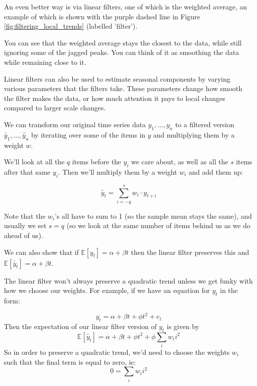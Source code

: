         An even better way is via linear filters, one of which is the weighted average, an example of which is shown with the purple dashed line in Figure \ref{fig:filtering_local_trends} (labelled 'filter').

        You can see that the weighted average stays the closest to the data, while still 
        ignoring some of the jagged peaks. You can think of it as smoothing the data while
        remaining close to it.

        Linear filters can also be used to estimate seasonal components by varying various parameters that the filters take. These parameters change how smooth the filter makes the data, or how much attention it pays to local changes compared to larger scale changes.

        We can transform our original time series data $y_1, \dots, y_n$ to a filtered
        version $\tilde{y_1}, \dots, \tilde{y_n}$ by iterating over some of the items
        in $y$ and multiplying them by a weight $w$. 

        We'll look at all the $q$ items before the $y_i$ we care about, as well as all the $s$
        items after that same $y_i$. Then we'll multiply them by a weight $w_i$ and add them
        up:

        \begin{equation*}
            \tilde{y_t} = \sum_{i = -q}^{s} w_i \cdot y_{t+i}
        \end{equation*}

        Note that the $w_i$'s all have to sum to 1 (so the sample mean stays the same), 
        and usually we set $s = q$ (so we look at the same number of items behind us 
        as we do ahead of us).

        We can also show that if $\mathbb{E}[y_t] = \alpha + \beta t$ then the linear filter
        preserves this and $\mathbb{E}[\tilde{y_t}] = \alpha + \beta t$.


        The linear filter won't always preserve a quadratic trend unless we get funky with
        how we choose our weights. For example, if we have an equation for $y_t$ in the
        form:

        \begin{equation*}
            y_t = \alpha + \beta t + \phi t^2 + e_t
        \end{equation*}
        Then the expectation of our linear filter version of $y_t$ is given by
        \begin{equation*}
            \mathbb{E}[\tilde{y_t}] = \alpha + \beta t + \phi t^2 + \phi \sum_i w_i i^2
        \end{equation*}
        So in order to preserve a quadratic trend, we'd need to choose the weights $w_i$ such
        that the final term is equal to zero, ie:
        \begin{equation*}
            0 = \sum_i w_i i^2
        \end{equation*}


